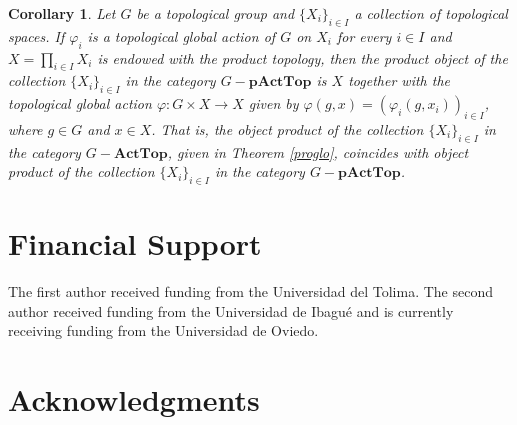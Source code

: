 \documentclass[sn-mathphys-num]{sn-jnl}%
\theoremstyle{thmstyleone}%
\newtheorem{corollary}[theorem]{Corollary}%
\theoremstyle{thmstyletwo}%
\theoremstyle{thmstylethree}%
\begin{document}
\begin{corollary}
Let $ G $ be a topological group and $\{X_i\}_{i\in I}$ a collection of topological spaces. If $ \varphi_i $ is a topological global action of $ G $ on $ X_i $ for every $i\in I$ and $X=\prod_{i\in I}X_i$ is endowed with the product topology, then the product object of the collection $\{X_i\}_{i\in I}$ in the category $G-\mathbf{pActTop}$ is $X$ together with the topological global action $\varphi:G\times X \to X$  given by $\varphi(g,x)=(\varphi_i(g,x_i))_{i\in I}$, where $g\in G$ and $x\in X$. That is, the object product of the collection $\{X_i\}_{i\in I}$ in the category $G-\mathbf{ActTop}$, given in Theorem \ref{proglo}, coincides with object product of the collection $\{X_i\}_{i\in I}$ in the category $G-\mathbf{pActTop}$. 
\end{corollary}









\section*{Financial Support}
The first author received funding from the Universidad del Tolima. The second author received funding from the Universidad de Ibagué and is currently receiving funding from the Universidad de Oviedo.


\section*{Acknowledgments}
\end{document}
